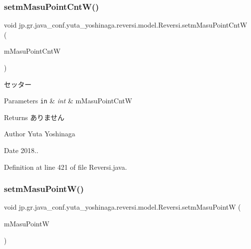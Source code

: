 \subsubsection{\texorpdfstring{setm\+Masu\+Point\+Cnt\+W()}{setmMasuPointCntW()}}
{\footnotesize\ttfamily void jp.\+gr.\+java\+\_\+conf.\+yuta\+\_\+yoshinaga.\+reversi.\+model.\+Reversi.\+setm\+Masu\+Point\+CntW (\begin{DoxyParamCaption}\item[{int}]{m\+Masu\+Point\+CntW }\end{DoxyParamCaption})}



セッター 


\begin{DoxyParams}[1]{Parameters}
\mbox{\tt in}  & {\em int} & m\+Masu\+Point\+CntW \\
\hline
\end{DoxyParams}
\begin{DoxyReturn}{Returns}
ありません 
\end{DoxyReturn}
\begin{DoxyAuthor}{Author}
Yuta Yoshinaga 
\end{DoxyAuthor}
\begin{DoxyDate}{Date}
2018.. 
\end{DoxyDate}


Definition at line 421 of file Reversi.\+java.

\mbox{\label{classjp_1_1gr_1_1java__conf_1_1yuta__yoshinaga_1_1reversi_1_1model_1_1_reversi_a3c7a1dfd53c9d84e23bb7c9895657261}} 
\subsubsection{\texorpdfstring{setm\+Masu\+Point\+W()}{setmMasuPointW()}}
{\footnotesize\ttfamily void jp.\+gr.\+java\+\_\+conf.\+yuta\+\_\+yoshinaga.\+reversi.\+model.\+Reversi.\+setm\+Masu\+PointW (\begin{DoxyParamCaption}\item[{\hyperlink{classjp_1_1gr_1_1java__conf_1_1yuta__yoshinaga_1_1reversi_1_1model_1_1_reversi_point}{Reversi\+Point} \mbox{[}$\,$\mbox{]}}]{m\+Masu\+PointW }\end{DoxyParamCaption})}



